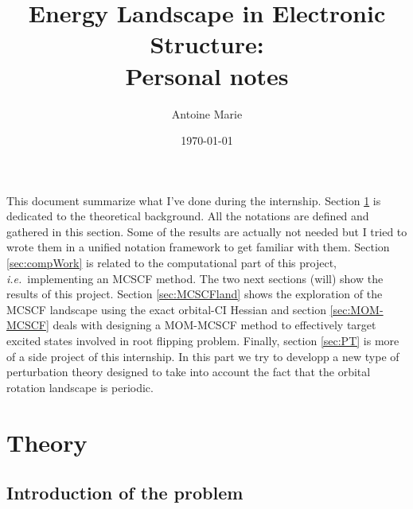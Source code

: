 \documentclass[11pt,a4paper]{article}
\title{\textbf{Energy Landscape in Electronic Structure:} \\
Personal notes}
\author{Antoine Marie}
\date{\today}
\newcommand{\ie}{\textit{i.e.}}
\begin{document}
\maketitle

This document summarize what I've done during the internship. Section \ref{sec:theory} is dedicated to the theoretical background.
All the notations are defined and gathered in this section.
Some of the results are actually not needed but I tried to wrote them in a unified notation framework to get familiar with them. 
Section \ref{sec:compWork} is related to the computational part of this project, \ie~implementing an MCSCF method.
The two next sections (will) show the results of this project.
Section \ref{sec:MCSCFland} shows the exploration of the MCSCF landscape using the exact orbital-CI Hessian and section \ref{sec:MOM-MCSCF} deals with designing a MOM-MCSCF method to effectively target excited states involved in root flipping problem.
Finally, section \ref{sec:PT} is more of a side project of this internship. In this part we try to developp a new type of perturbation theory designed to take into account the fact that the orbital rotation landscape is periodic.

\tableofcontents

\newpage

\section{Theory}
\label{sec:theory}

\subsection{Introduction of the problem}
\label{sec:intro}
\end{document}
